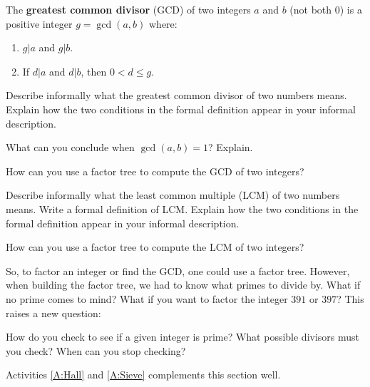 \begin{definition} 
The \textbf{greatest common divisor} (GCD) of two integers $a$ and $b$ (not both 0)
is a positive integer $g = \gcd(a,b)$ where:
\begin{enumerate}
\item $g|a$ and $g|b$.
\item If $d|a$ and $d|b$, then $0 < d \le g$.
\end{enumerate}
\end{definition}

\begin{question}
Describe informally what the greatest common divisor of two numbers means.  
Explain how the two conditions in the formal definition appear in your informal description. 
\end{question}
\QM

\begin{question}
What can you conclude when $\gcd(a,b)=1$?  Explain. 
\end{question}
\QM

\begin{question}
How can you use a factor tree to compute the GCD of two integers?
\end{question}
\QM

\begin{question}
Describe informally what the least common multiple (LCM) 
of two numbers means.  Write a formal definition of LCM.  Explain how the two conditions in the formal 
definition appear in your informal description. 
\end{question}
\QM

\begin{question}
How can you use a factor tree to compute the LCM of two integers?
\end{question}
\QM


So, to factor an integer or find the GCD, one could use a factor
tree. However, when building the factor tree, we had to know what
primes to divide by. What if no prime comes to mind? What if you want
to factor the integer $391$ or $397$? This raises a new question:

\begin{question} 
How do you check to see if a given integer is prime? What possible
divisors must you check? When can you stop checking?
\end{question}
\QM


\begin{activitynote}
Activities \ref{A:Hall} and \ref{A:Sieve} complements this section well. %
\end{activitynote}


